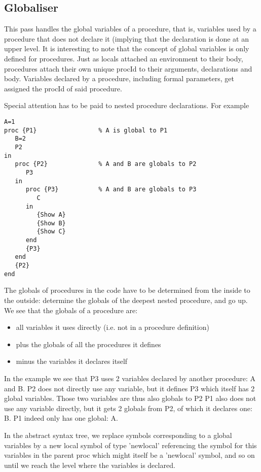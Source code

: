 \documentclass[a4paper]{memoir}
\begin{document}
\subsection{Globaliser}            
This pass handles the global variables of a procedure, that is, variables used by a procedure that does not declare it (implying that the declaration is done at an upper level. It is interesting to note that the concept of global variables is only defined for procedures.
Just as locals attached an environment to their body, procedures attach their own unique procId to their arguments, declarations and body.
Variables declared by a procedure, including formal parameters, get assigned the procId of said procedure.

Special attention has to be paid to nested procedure declarations. For example
\begin{lstlisting}
A=1
proc {P1}                 % A is global to P1
   B=2
   P2
in
   proc {P2}              % A and B are globals to P2
      P3 
   in
      proc {P3}           % A and B are globals to P3
         C
      in
         {Show A}
         {Show B}
         {Show C}
      end
      {P3}
   end
   {P2}
end
\end{lstlisting}

The globals of procedures in the code have to be determined from the inside to the outside: determine the globals of the deepest nested procedure, and go up. 
We see that the globals of a procedure are:
\begin{itemize}
  \item all variables it uses directly (i.e. not in a procedure definition)
  \item plus the globals of all the procedures it defines
  \item minus the variables it declares itself
\end{itemize}

In the example we see that P3 uses 2 variables declared by another procedure: A and B. 
P2 does not directly use any variable, but it defines P3 which itself has 2 global variables. Those two variables are thus also globals to P2
P1 also does not use any variable directly, but it gets 2 globals from P2, of which it declares one: B. P1 indeed only has one global: A.

In the abstract syntax tree, we replace symbols corresponding to a global variables by a new local symbol of type 'newlocal' referencing the symbol for this variables in the parent proc which might itself be a 'newlocal' symbol, and so on until we reach the level where the variables is declared.
\end{document}
